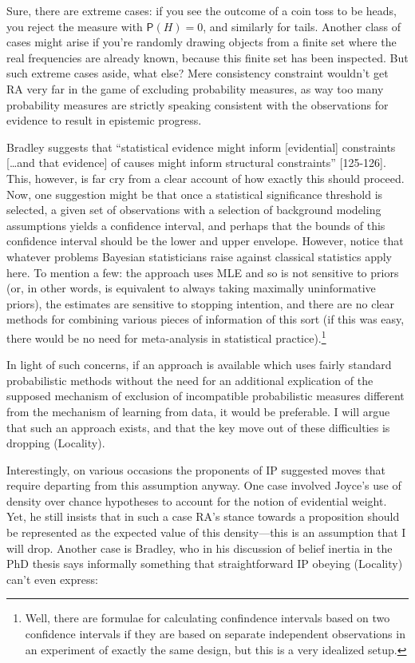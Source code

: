 \documentclass[
  10pt,
  dvipsnames,enabledeprecatedfontcommands]{scrartcl}
\begin{document}
Sure, there are extreme cases: if you see the outcome of a coin toss to
be heads, you reject the measure with \(\mathsf{P}(H)=0\), and similarly
for tails. Another class of cases might arise if you're randomly drawing
objects from a finite set where the real frequencies are already known,
because this finite set has been inspected. But such extreme cases
aside, what else? Mere consistency constraint wouldn't get RA very far
in the game of excluding probability measures, as way too many
probability measures are strictly speaking consistent with the
observations for evidence to result in epistemic progress.

Bradley suggests that ``statistical evidence might inform
{[}evidential{]} constraints {[}\dots and that evidence{]} of causes
might inform structural constraints'' {[}125-126{]}. This, however, is
far cry from a clear account of how exactly this should proceed. Now,
one suggestion might be that once a statistical significance threshold
is selected, a given set of observations with a selection of background
modeling assumptions yields a confidence interval, and perhaps that the
bounds of this confidence interval should be the lower and upper
envelope. However, notice that whatever problems Bayesian statisticians
raise against classical statistics apply here. To mention a few: the
approach uses MLE and so is not sensitive to priors (or, in other words,
is equivalent to always taking maximally uninformative priors), the
estimates are sensitive to stopping intention, and there are no clear
methods for combining various pieces of information of this sort (if
this was easy, there would be no need for meta-analysis in statistical
practice).\footnote{Well, there are formulae for calculating confindence intervals based on two confidence intervals if they are based on separate independent observations in an experiment of exactly the same design, but this is a very idealized setup.}

In light of such concerns, if an approach is available which uses fairly
standard probabilistic methods without the need for an additional
explication of the supposed mechanism of exclusion of incompatible
probabilistic measures different from the mechanism of learning from
data, it would be preferable. I will argue that such an approach exists,
and that the key move out of these difficulties is dropping (Locality).

Interestingly, on various occasions the proponents of IP suggested moves
that require departing from this assumption anyway. One case involved
Joyce's use of density over chance hypotheses to account for the notion
of evidential weight. Yet, he still insists that in such a case RA's
stance towards a proposition should be represented as the expected value
of this density---this is an assumption that I will drop. Another case
is Bradley, who in his discussion of belief inertia in the PhD thesis
says informally something that straightforward IP obeying (Locality)
can't even express:
\end{document}
